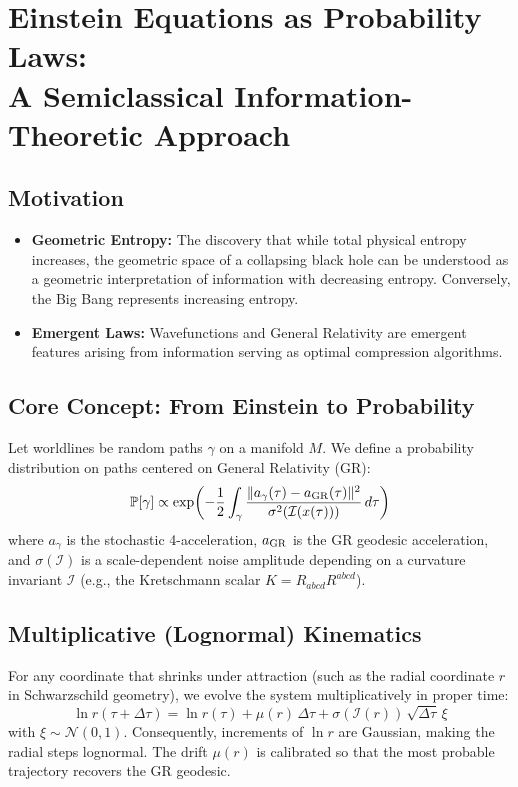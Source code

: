 \documentclass[11pt]{article}
\begin{document}
\section{\textbf{Einstein Equations as Probability Laws: \\ A Semiclassical Information-Theoretic Approach}}

\subsection{Motivation}
\begin{itemize}
    \item \textbf{Geometric Entropy:} The discovery that while total physical entropy increases, the geometric space of a collapsing black hole can be understood as a geometric interpretation of information with decreasing entropy. Conversely, the Big Bang represents increasing entropy.
    \item \textbf{Emergent Laws:} Wavefunctions and General Relativity are emergent features arising from information serving as optimal compression algorithms.
\end{itemize}

\subsection{Core Concept: From Einstein to Probability}
Let worldlines be random paths $\gamma$ on a manifold $M$. We define a probability distribution on paths centered on General Relativity (GR):
\[
\mathbb{P}[\gamma] \propto \exp\!\left( -\frac{1}{2}\int_\gamma \frac{\|a_\gamma(\tau)-a_{\rm GR}(\tau)\|^2}{\sigma^2(\mathcal{I}(x(\tau)))}\, d\tau \right)
\]
where $a_\gamma$ is the stochastic 4-acceleration, $a_{\rm GR}$ is the GR geodesic acceleration, and $\sigma(\mathcal{I})$ is a scale-dependent noise amplitude depending on a curvature invariant $\mathcal{I}$ (e.g., the Kretschmann scalar $K=R_{abcd}R^{abcd}$).

\subsection{Multiplicative (Lognormal) Kinematics}
For any coordinate that shrinks under attraction (such as the radial coordinate $r$ in Schwarzschild geometry), we evolve the system multiplicatively in proper time:
\[
\ln r(\tau+\Delta\tau) = \ln r(\tau) + \mu(r)\,\Delta\tau + \sigma(\mathcal{I}(r))\,\sqrt{\Delta\tau}\,\xi
\]
with $\xi \sim \mathcal{N}(0,1)$. Consequently, increments of $\ln r$ are Gaussian, making the radial steps lognormal. The drift $\mu(r)$ is calibrated so that the most probable trajectory recovers the GR geodesic.
\end{document}
